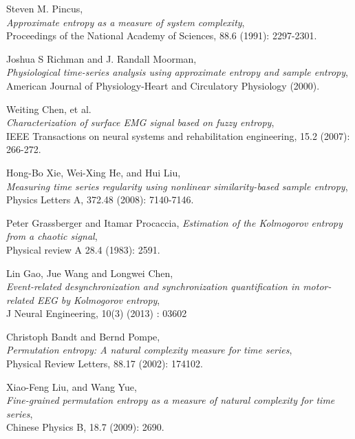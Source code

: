 \documentclass[12pt, a4paper, titlepage, openany]{book}
\newcommand\chapterimage[2][]{%
  \AddToShipoutPictureBG*{%
    \AtTextUpperLeft{%
     \hspace*{\textwidth}%
      \llap{%
            \texttt{[image: \#2]}}}}}%
\begin{document}
\renewcommand\bibname{\textbf{References}}
\begin{thebibliography}{9} 
\chapterimage[width=16cm, height=3cm]{Chapter Banner2.png}

\footnotesize
{} 
Steven M. Pincus, \\
\emph{Approximate entropy as a measure of system complexity},\\
Proceedings of the National Academy of Sciences,  88.6 (1991): 2297-2301.

Joshua S Richman and J. Randall Moorman, \\
\emph{Physiological time-series analysis using approximate entropy and sample entropy},\\
American Journal of Physiology-Heart and Circulatory Physiology (2000).

Weiting Chen, et al.\\
\emph{Characterization of surface EMG signal based on fuzzy entropy},\\
IEEE Transactions on neural systems and rehabilitation engineering, 15.2 (2007): 266-272.

Hong-Bo Xie, Wei-Xing He, and Hui Liu,\\
\emph{Measuring time series regularity using nonlinear similarity-based sample entropy},\\
Physics Letters A, 372.48 (2008): 7140-7146.

Peter Grassberger and Itamar Procaccia,
\emph{Estimation of the Kolmogorov entropy from a chaotic signal},\\
Physical review A 28.4 (1983): 2591.
 
Lin Gao, Jue Wang  and Longwei Chen,\\
\emph{Event-related desynchronization and synchronization quantification in motor-related EEG by Kolmogorov entropy},\\
J Neural Engineering, 10(3) (2013) : 03602

Christoph Bandt and Bernd Pompe, \\
\emph{Permutation entropy: A natural complexity measure for time series},\\
Physical Review Letters,  88.17 (2002): 174102.
 
Xiao-Feng Liu, and Wang Yue,\\
\emph{Fine-grained permutation entropy as a measure of natural complexity for time series},\\
Chinese Physics B, 18.7 (2009): 2690.
 

\end{thebibliography}
\end{document}
